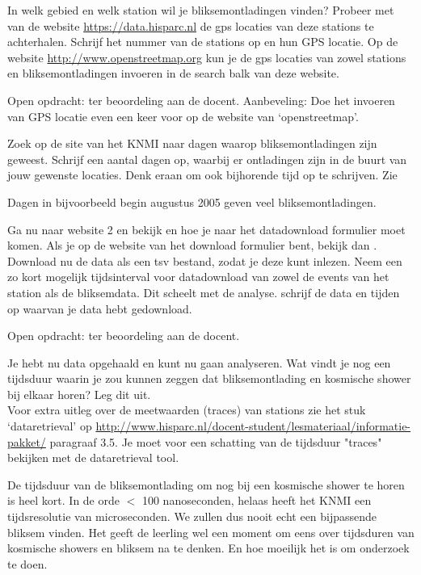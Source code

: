 \begin{questions}
\question
In welk gebied en welk station wil je bliksemontladingen vinden? Probeer met
van de website \url{https://data.hisparc.nl} de gps locaties van deze stations te
achterhalen. Schrijf het nummer van de stations op en hun GPS locatie.
Op de website \url{http://www.openstreetmap.org} kun je de gps locaties van zowel
stations en bliksemontladingen invoeren in de search balk van deze website.
\begin{solution}
    Open opdracht: ter beoordeling aan de docent. Aanbeveling: Doe het invoeren van GPS locatie
    even een keer voor op de website van `openstreetmap'.
\end{solution}

\question
Zoek op de site van het KNMI naar dagen waarop bliksemontladingen zijn geweest.
Schrijf een aantal dagen op, waarbij er ontladingen zijn in de buurt van jouw gewenste
locaties. Denk eraan om ook bijhorende tijd op te schrijven. Zie 
\begin{solution}
    Dagen in bijvoorbeeld begin augustus 2005 geven veel bliksemontladingen.
\end{solution}

\question
Ga nu naar website 2 en bekijk  en 
hoe je naar het datadownload formulier moet komen.
Als je op de website van het download formulier bent, bekijk dan .
Download nu de data als een tsv bestand, zodat je deze kunt inlezen. Neem een zo kort mogelijk tijdsinterval
voor datadownload van zowel de events van het \hisparc station als de bliksemdata.
Dit scheelt met de analyse. schrijf de data en tijden op waarvan je data hebt gedownload.
\begin{solution}
    Open opdracht: ter beoordeling aan de docent.
\end{solution}

\question
Je hebt nu data opgehaald en kunt nu gaan analyseren.
Wat vindt je nog een tijdsduur waarin je zou kunnen zeggen dat bliksemontlading
en kosmische shower bij elkaar horen? Leg dit uit. \\
\small{Voor extra uitleg over de meetwaarden (traces) van \hisparc stations zie het stuk `dataretrieval'
op \url{ http://www.hisparc.nl/docent-student/lesmateriaal/informatie-pakket/} paragraaf 3.5.
Je moet voor een schatting van de tijdsduur "traces" bekijken met de dataretrieval tool.}
\begin{solution}
    De tijdsduur van de bliksemontlading om nog bij een kosmische shower te horen
    is heel kort. In de orde $<$ 100 nanoseconden, helaas heeft het KNMI een tijdsresolutie
    van microseconden. We zullen dus nooit echt een bijpassende bliksem vinden.
    Het geeft de leerling wel een moment om eens over tijdsduren van kosmische showers en bliksem
    na te denken. En hoe moeilijk het is om onderzoek te doen.
\end{solution}


\end{questions}
